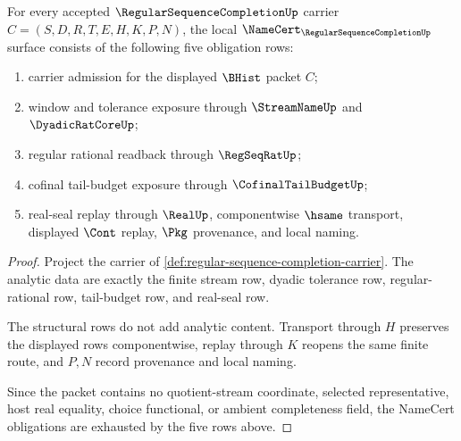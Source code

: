 \begin{theorem}
\label{thm:regular-sequence-completion-namecert-obligations}
For every accepted $\RegularSequenceCompletionUp$ carrier $C=(S,D,R,T,E,H,K,P,N)$, the local $\NameCert_{\RegularSequenceCompletionUp}$ surface consists of the following five obligation rows:
\begin{enumerate}
\item carrier admission for the displayed $\BHist$ packet $C$;
\item window and tolerance exposure through $\StreamNameUp$ and $\DyadicRatCoreUp$;
\item regular rational readback through $\RegSeqRatUp$;
\item cofinal tail-budget exposure through $\CofinalTailBudgetUp$;
\item real-seal replay through $\RealUp$, componentwise $\hsame$ transport, displayed $\Cont$ replay, $\Pkg$ provenance, and local naming.
\end{enumerate}
\end{theorem}
\begin{proof}
Project the carrier of \autoref{def:regular-sequence-completion-carrier}. The analytic data are exactly the finite stream row, dyadic tolerance row, regular-rational row, tail-budget row, and real-seal row.

The structural rows do not add analytic content. Transport through $H$ preserves the displayed rows componentwise, replay through $K$ reopens the same finite route, and $P,N$ record provenance and local naming.

Since the packet contains no quotient-stream coordinate, selected representative, host real equality, choice functional, or ambient completeness field, the NameCert obligations are exhausted by the five rows above.
\end{proof}

